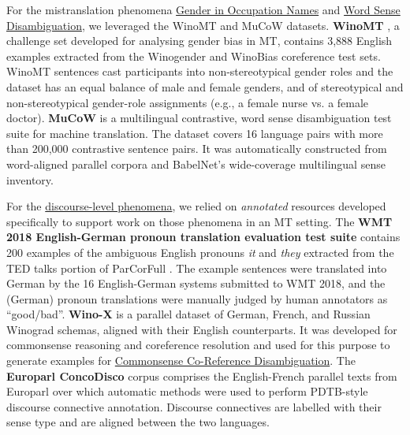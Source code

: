 \documentclass[11pt]{article}
\begin{document}
For the mistranslation phenomena
\hyperref[subsec:gender_in_occupation_names]{Gender in Occupation Names} and \hyperref[subsec:wsd]{Word Sense Disambiguation}, we leveraged the WinoMT and MuCoW datasets. \textbf{WinoMT} \citep{stanovsky-etal-2019-evaluating}, a challenge set developed for analysing gender bias in MT, contains 3,888 English examples extracted from the Winogender \citep{rudinger-etal-2017-social} and WinoBias \citep{zhao-etal-2018-gender} coreference test sets. WinoMT sentences cast participants into non-stereotypical gender roles and the dataset has an equal balance of male and female genders, and of stereotypical and non-stereotypical gender-role assignments (e.g., a female nurse vs. a female doctor). \textbf{MuCoW} \citep{raganato-etal-2019-mucow} is a multilingual contrastive, word sense disambiguation test suite for machine translation. The dataset covers 16 language pairs with more than 200,000 contrastive sentence pairs. It was automatically constructed from word-aligned parallel corpora and BabelNet's \citep{navigli-2012}  wide-coverage multilingual sense inventory. 

For the \hyperref[sec:discourse]{discourse-level phenomena}, we relied on \textit{annotated} resources developed specifically to support work on those phenomena in an MT setting. The \textbf{WMT 2018 English-German pronoun translation evaluation test suite} \citep{guillou-etal-2018-pronoun} contains 200 examples of the ambiguous English pronouns \textit{it} and \textit{they} extracted from the TED talks portion of ParCorFull \citep{lapshinova-koltunski-etal-2018-parcorfull}. The example sentences were translated into German by the 16 English-German systems submitted to WMT 2018, and the (German) pronoun translations were manually judged by human annotators as ``good/bad''. \textbf{Wino-X} \citep{emelin-sennrich-2021-wino} is a parallel dataset of German, French, and Russian Winograd schemas, aligned with their English counterparts. It was developed for commonsense reasoning and coreference resolution and used for this purpose to generate examples for  \hyperref[sec:commonsense-coref]{Commonsense Co-Reference Disambiguation}. The \textbf{Europarl ConcoDisco} corpus \citep{laali-kosseim-2017-improving} comprises the English-French parallel texts from Europarl \citep{koehn-2005-europarl} over which automatic methods were used to perform PDTB-style discourse connective annotation. Discourse connectives are labelled with their sense type and are aligned between the two languages.
\end{document}
